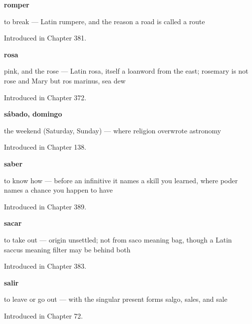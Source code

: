 \noindent\begin{minipage}[t]{\linewidth}
\raggedright
\textbf{romper}\par
\small to break — Latin rumpere, and the reason a road is called a route\par
\footnotesize Introduced in Chapter 381.
\end{minipage}\par\medskip

\noindent\begin{minipage}[t]{\linewidth}
\raggedright
\textbf{rosa}\par
\small pink, and the rose — Latin rosa, itself a loanword from the east; rosemary is not rose and Mary but ros marinus, sea dew\par
\footnotesize Introduced in Chapter 372.
\end{minipage}\par\medskip

\noindent\begin{minipage}[t]{\linewidth}
\raggedright
\textbf{sábado, domingo}\par
\small the weekend (Saturday, Sunday) — where religion overwrote astronomy\par
\footnotesize Introduced in Chapter 138.
\end{minipage}\par\medskip

\noindent\begin{minipage}[t]{\linewidth}
\raggedright
\textbf{saber}\par
\small to know how — before an infinitive it names a skill you learned, where poder names a chance you happen to have\par
\footnotesize Introduced in Chapter 389.
\end{minipage}\par\medskip

\noindent\begin{minipage}[t]{\linewidth}
\raggedright
\textbf{sacar}\par
\small to take out — origin unsettled; not from saco meaning bag, though a Latin saccus meaning filter may be behind both\par
\footnotesize Introduced in Chapter 383.
\end{minipage}\par\medskip

\noindent\begin{minipage}[t]{\linewidth}
\raggedright
\textbf{salir}\par
\small to leave or go out — with the singular present forms salgo, sales, and sale\par
\footnotesize Introduced in Chapter 72.
\end{minipage}\par\medskip

